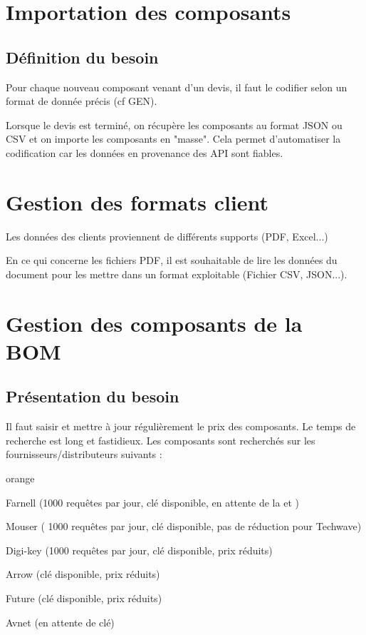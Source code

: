 {\chapter{Importation des composants}

\section{Définition du besoin}

Pour chaque nouveau composant venant d'un devis, il faut le codifier selon un format de donnée précis (cf GEN).

Lorsque le devis est terminé, on récupère les composants au format JSON ou CSV et on importe les composants en "masse". Cela permet d'automatiser la codification car les données en provenance des API sont fiables.%

\chapter{Gestion des formats client}

Les données des clients proviennent de différents supports (PDF, Excel...)

En ce qui concerne les fichiers PDF, il est souhaitable de lire les données du document pour les mettre dans un format exploitable (Fichier CSV, JSON...).


\chapter{Gestion des composants de la BOM}
\section{Présentation du besoin}

Il faut saisir et mettre à jour régulièrement le prix des composants. Le temps de recherche est long et fastidieux. Les composants sont recherchés sur les fournisseurs/distributeurs suivants  :

\begin{items}{orange}{\Bullet}
\item Farnell (1000 requêtes par jour, clé disponible, en attente de la  et )
\item Mouser ( 1000 requêtes par jour, clé disponible, pas de réduction pour Techwave)
\item Digi-key (1000 requêtes par jour, clé disponible, prix réduits)
\item Arrow (clé disponible, prix réduits)
\item Future (clé disponible, prix réduits)
\item Avnet (en attente de clé)
\end{items}


}
